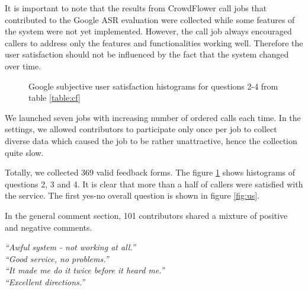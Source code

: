 It is important to note that the results from CrowdFlower call jobs that contributed to the Google \ac{ASR} evaluation were collected while some features of the system were not yet implemented.
However, the call job always encouraged callers to address only the features and functionalities working well.
Therefore the user satisfaction should not be influenced by the fact that the system changed over time.

\begin{figure}[ht]
\caption{Google subjective user satisfaction histograms for questions 2-4 from table \ref{table:cf}}
\label{fig:google}
\end{figure}

We launched seven jobs with increasing number of ordered calls each time.
In the settings, we allowed contributors to participate only once per job to collect diverse data which caused the job to be rather unattractive, hence the collection quite slow.

Totally, we collected 369 valid feedback forms.
The figure \ref{fig:google} shows histograms of questions 2, 3 and 4.
It is clear that more than a half of callers were satisfied with the service.
The first yes-no overall question is shown in figure \ref{fig:us}.

In the general comment section, 101 contributors shared a mixture of positive and negative comments.

\begin{flushleft}
\textit{``Awful system - not working at all.''} \\
\textit{``Good service, no problems.''} \\
\textit{``It made me do it twice before it heard me.''} \\
\textit{``Excellent directions.''} \\
\end{flushleft}

